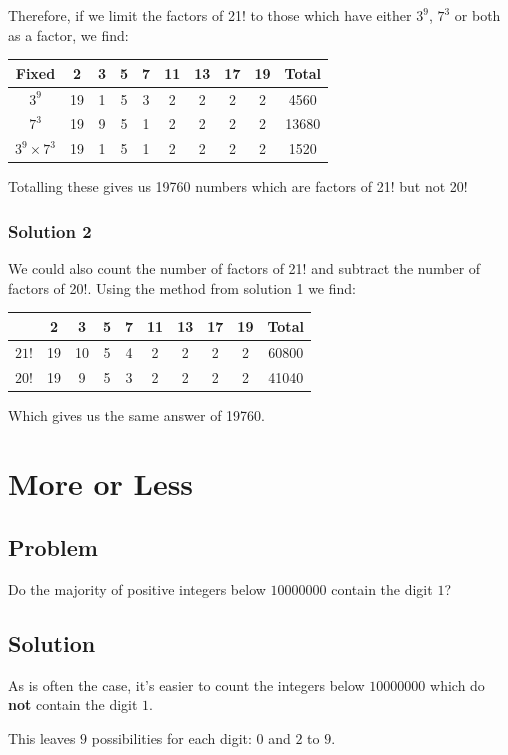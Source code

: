\documentclass{book}
\begin{document}
Therefore, if we limit the factors of 21! to those which have either \(3^9\), \(7^3\) or both as a factor, we find:
\begin{center}
\begin{tabular}{ |c|c|c|c|c|c|c|c|c|c| }
\hline
Fixed & 2 & 3 & 5 & 7 & 11 & 13 & 17 & 19 & Total \\
\hline
\(3^9\) & 19 & 1 & 5 & 3 & 2 & 2 & 2 & 2 & 4560\\
\(7^3\) & 19 & 9 & 5 & 1 & 2 & 2 & 2 & 2 & 13680\\
\(3^9 \times 7^3\) & 19 & 1 & 5 & 1 & 2 & 2 & 2 & 2 & 1520\\
\hline
\end{tabular}
\end{center}
Totalling these gives us 19760 numbers which are factors of 21! but not 20!

\subsubsection{Solution 2}
We could also count the number of factors of 21! and subtract the number of factors of 20!. Using the method from solution 1 we find:
\begin{center}
\begin{tabular}{ |c|c|c|c|c|c|c|c|c|c| }
\hline
 & 2 & 3 & 5 & 7 & 11 & 13 & 17 & 19 & Total \\
\hline
\(21!\) & 19 & 10 & 5 & 4 & 2 & 2 & 2 & 2 & 60800\\
\(20!\) & 19 & 9 & 5 & 3 & 2 & 2 & 2 & 2 & 41040\\
\hline
\end{tabular}
\end{center}
Which gives us the same answer of 19760.
\newpage
\section{More or Less}
\subsection{Problem}
Do the majority of positive integers below \(10 000 000\) contain the digit \(1\)?
\subsection{Solution}
As is often the case, it's easier to count the integers below \(10000000\) which do \textbf{not} contain the digit \(1\).

This leaves \(9\) possibilities for each digit: \(0\) and \(2\) to \(9\).
\end{document}
